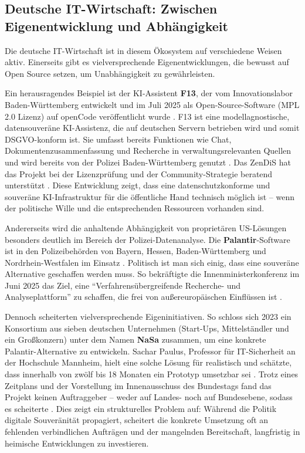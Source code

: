\documentclass[12pt,a4paper]{article}
\begin{document}
	\subsection{Deutsche IT-Wirtschaft: Zwischen Eigenentwicklung und Abhängigkeit}
	
	Die deutsche IT-Wirtschaft ist in diesem Ökosystem auf verschiedene Weisen aktiv. Einerseits gibt es vielversprechende Eigenentwicklungen, die bewusst auf Open Source setzen, um Unabhängigkeit zu gewährleisten.
	
	Ein herausragendes Beispiel ist der KI-Assistent \textbf{F13}, der vom Innovationslabor Baden-Württemberg entwickelt und im Juli 2025 als Open-Source-Software (MPL 2.0 Lizenz) auf openCode veröffentlicht wurde \cite{Staatsanzeiger2025}. F13 ist eine modellagnostische, datensouveräne KI-Assistenz, die auf deutschen Servern betrieben wird und somit DSGVO-konform ist. Sie umfasst bereits Funktionen wie Chat, Dokumentenzusammenfassung und Recherche in verwaltungsrelevanten Quellen und wird bereits von der Polizei Baden-Württemberg genutzt \cite{Staatsanzeiger2025}. Das ZenDiS hat das Projekt bei der Lizenzprüfung und der Community-Strategie beratend unterstützt \cite{ZenDiS2025b}. Diese Entwicklung zeigt, dass eine datenschutzkonforme und souveräne KI-Infrastruktur für die öffentliche Hand technisch möglich ist – wenn der politische Wille und die entsprechenden Ressourcen vorhanden sind.
	
	Andererseits wird die anhaltende Abhängigkeit von proprietären US-Lösungen besonders deutlich im Bereich der Polizei-Datenanalyse. Die \textbf{Palantir}-Software ist in den Polizeibehörden von Bayern, Hessen, Baden-Württemberg und Nordrhein-Westfalen im Einsatz \cite{Tagesschau2025}. Politisch ist man sich einig, dass eine souveräne Alternative geschaffen werden muss. So bekräftigte die Innenministerkonferenz im Juni 2025 das Ziel, eine \enquote{Verfahrensübergreifende Recherche- und Analyseplattform} zu schaffen, die frei von außereuropäischen Einflüssen ist \cite{Tagesschau2025}.
	
	Dennoch scheiterten vielversprechende Eigeninitiativen. So schloss sich 2023 ein Konsortium aus sieben deutschen Unternehmen (Start-Ups, Mittelständler und ein Großkonzern) unter dem Namen \textbf{NaSa} zusammen, um eine konkrete Palantir-Alternative zu entwickeln. Sachar Paulus, Professor für IT-Sicherheit an der Hochschule Mannheim, hielt eine solche Lösung für realistisch und schätzte, dass innerhalb von zwölf bis 18 Monaten ein Prototyp umsetzbar sei \cite{Tagesschau2025}. Trotz eines Zeitplans und der Vorstellung im Innenausschuss des Bundestags fand das Projekt keinen Auftraggeber – weder auf Landes- noch auf Bundesebene, sodass es scheiterte \cite{Tagesschau2025}. Dies zeigt ein strukturelles Problem auf: Während die Politik digitale Souveränität propagiert, scheitert die konkrete Umsetzung oft an fehlenden verbindlichen Aufträgen und der mangelnden Bereitschaft, langfristig in heimische Entwicklungen zu investieren.
	
\end{document}

